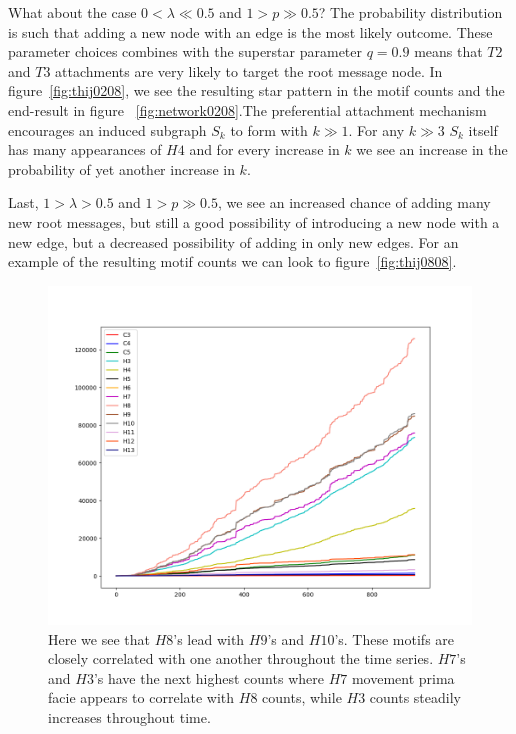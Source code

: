 What about the case $0 < \lambda \ll 0.5$ and $1 > p \gg 0.5$? The probability distribution is such that adding a new node
with an edge is the most likely outcome. These parameter choices combines with the superstar parameter $q=0.9$ means that $T2$ and $T3$
attachments are very likely to target the root message node. In figure~\ref{fig:thij0208}, we see the resulting star pattern in the motif counts 
and the end-result in figure ~\ref{fig:network0208}.The preferential attachment mechanism  encourages
an induced subgraph $S_{k}$ to form with $k\gg 1$. For any $k \gg 3$ $S_{k}$
itself has many appearances of $H4$ and for every increase in $k$ we see an increase in the probability
of yet another increase in $k$.


Last, $1>\lambda>0.5$ and $1>p\gg0.5$, we see an increased chance of adding
many new root messages, but still a good possibility of introducing a new node with a new edge, but a decreased possibility of 
adding in only new edges. For an example of the resulting motif counts we can look to figure~\ref{fig:thij0808}. 


\begin{figure}[h!]
    \includegraphics[width=15cm]{Images/twitter_sim_for_stats_3_0.2_0.2.png}
    \centering
    \caption{Here we see that $H8$'s lead with $H9$'s and $H10$'s. These motifs are
     closely correlated with one another throughout the time series. $H7$'s
    and $H3$'s have the next highest counts where $H7$ movement prima facie
    appears to correlate with $H8$ counts, while $H3$ counts steadily increases throughout time.}
    \label{fig:thij0202}
\end{figure}

